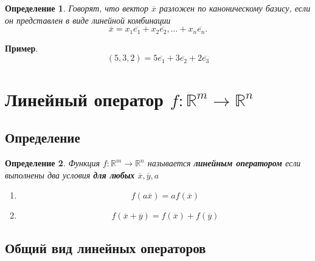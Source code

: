 \documentclass[]{article}
\newtheorem{dfn}{Определение}
\begin{document}
	\begin{dfn}
		Говорят, что вектор $\overline{x}$ разложен по каноническому базису, если он представлен в виде линейной комбинации
		$$\overline{x}=x_1\overline{e_1}+ x_2\overline{e_2},\ldots+ x_n\overline{e_n}.$$
	\end{dfn}
	\textbf{Пример}.
	\begin{equation*}
		(5,3,2) = 5\overline{e_1}+3\overline{e_2}+2\overline{e_3}
	\end{equation*} 
	
	\section{Линейный оператор $f:\mathbb{R}^m\rightarrow\mathbb{R}^n$}
	\subsection{Определение}
	\begin{dfn}
		Функция $f:\mathbb{R}^m\rightarrow\mathbb{R}^n$ называется \textbf{линейным оператором} если выполнены два условия \textbf{для любых} $\overline{x}, \overline{y}, a$
		\begin{enumerate}
			\item $$f(a\overline{x})=af(\overline{x})$$
			\item $$f(\overline{x}+\overline{y})=f(\overline{x})+f(\overline{y})$$
		\end{enumerate}
	\end{dfn}
	
	\subsection{Общий вид линейных операторов}
\end{document}
